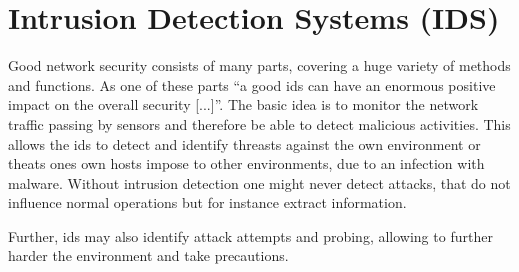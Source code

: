 

\section{Intrusion Detection Systems (IDS)}
\label{sec:background:network:ids}

Good network security consists of many parts, covering a huge variety of methods and functions. 
As one of these parts \enquote{a good \gls{ids} can have an enormous positive impact on the overall security [...]}. \parencite{Northcutt2005}
The basic idea is to monitor the network traffic passing by sensors and therefore be able to detect malicious activities.
This allows the \gls{ids} to detect and identify threasts against the own environment or theats ones own hosts impose to other environments, due to an infection with malware.
Without intrusion detection one might never detect attacks, that do not influence normal operations but for instance extract information.

Further, \gls{ids} may also identify attack attempts and probing, allowing to further harder the environment and take precautions.

